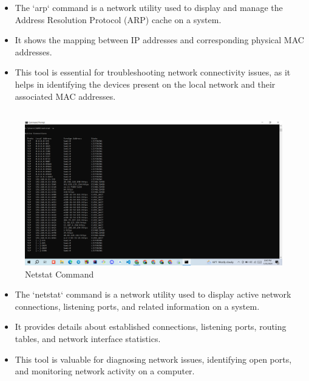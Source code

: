 \documentclass[11pt]{article}
\begin{document}
\begin{itemize}
  \item The `arp` command is a network utility used to display and manage the Address Resolution Protocol (ARP) cache on a system.
  \item It shows the mapping between IP addresses and corresponding physical MAC addresses.
  \item This tool is essential for troubleshooting network connectivity issues, as it helps in identifying the devices present on the local network and their associated MAC addresses.
\end{itemize}



\subsection{}
\begin{figure}[!h]
\centering
\includegraphics[width=\textwidth]{Screenshot (5).png}
\caption{Netstat Command}
\end{figure}

\begin{itemize}
  \item The `netstat` command is a network utility used to display active network connections, listening ports, and related information on a system.
  \item It provides details about established connections, listening ports, routing tables, and network interface statistics.
  \item This tool is valuable for diagnosing network issues, identifying open ports, and monitoring network activity on a computer.
\end{itemize}
\end{document}
